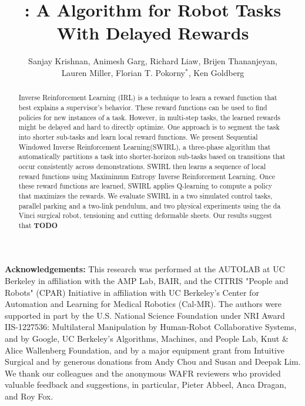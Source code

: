 \documentclass[Afour,sageh,times]{sagej}
\title{\LARGE \bf \hirl: A \hirlfull Algorithm for Robot Tasks With Delayed Rewards}
\author{%
Sanjay Krishnan, 
Animesh Garg, 
Richard Liaw,
Brijen Thananjeyan,\\
Lauren Miller,
Florian T. Pokorny$^{*}$,
Ken Goldberg%
}
\affiliation{\affilnum{1}AUTOLAB UC Berkeley\\
\affilnum{2}KTH Sweden}
\newcommand{\hirl}{SWIRL\xspace}
\newcommand{\hirlfull}{Sequential Windowed Inverse Reinforcement Learning\xspace}
\begin{document}
\begin{abstract}
Inverse Reinforcement Learning (IRL) is a technique to learn a reward function that best explains a supervisor's behavior.
These reward functions can be used to find policies for new instances of a task.
However, in multi-step tasks, the learned rewards might be delayed and hard to directly optimize.
One approach is to segment the task into shorter sub-tasks and learn local reward functions.
We present \hirlfull (\hirl), a three-phase algorithm that automatically partitions a task into shorter-horizon sub-tasks based on transitions that occur consistently across demonstrations.
\hirl then learns a sequence of local reward functions using Maximimum Entropy Inverse Reinforcement Learning. 
Once these reward functions are learned, \hirl applies Q-learning to compute a policy that maximizes the rewards. 
We evaluate \hirl in a two simulated control tasks, parallel parking and a two-link pendulum, and two physical experiments using the da Vinci surgical robot, tensioning and cutting deformable sheets.
Our results suggest that \textbf{TODO}
\end{abstract} 

\maketitle












\vspace{0.5em}

{\footnotesize 
\noindent \textbf{Acknowledgements:}
This research was performed at the AUTOLAB at UC Berkeley in
affiliation with the AMP Lab, BAIR, and the CITRIS "People and Robots" (CPAR) Initiative in affiliation with UC Berkeley's Center for Automation and Learning for Medical Robotics (Cal-MR). The authors were supported in part by the U.S. National Science Foundation under NRI Award IIS-1227536: Multilateral Manipulation by Human-Robot Collaborative Systems, and by Google, UC Berkeley's Algorithms, Machines, and People Lab, Knut \& Alice Wallenberg Foundation, and by a major equipment grant from Intuitive Surgical and by generous donations from Andy Chou and Susan and Deepak Lim. We thank our colleagues and the anonymous WAFR reviewers who provided valuable feedback and suggestions, in particular, Pieter Abbeel, Anca Dragan, and Roy Fox.}






%
\end{document}
